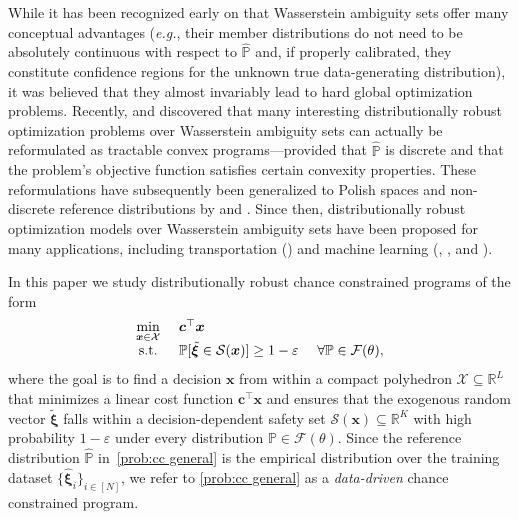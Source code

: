 \documentclass[nonblindrev]{informs2017}
\newcommand{\bmt}[1]{\tilde{\bm{#1}}}
\newcommand{\bmh}[1]{\hat{\bm{#1}}}
\newcommand{\1}[1]{\mathds{1}{\left(#1\right)}}
\begin{document}
While it has been recognized early on that Wasserstein ambiguity sets offer many conceptual advantages (\emph{e.g.}, their member distributions do not need to be absolutely continuous with respect to $\hat{\mathbb{P}}$ and, if properly calibrated, they constitute confidence regions for the unknown true data-generating distribution), it was believed that they almost invariably lead to hard global optimization problems. Recently, \citet{Esfahani_Kuhn_2017} and \citet{Zhao_Guan_2018} discovered that many interesting distributionally robust optimization problems over Wasserstein ambiguity sets can actually be reformulated as tractable convex programs---provided that $\hat{\mathbb{P}}$ is discrete and that the problem's objective function satisfies certain convexity properties. These reformulations have subsequently been generalized to Polish spaces and non-discrete reference distributions by \citet{blanchet2016quantifying} and \citet{Gao_Kleywegt_2016}. Since then, distributionally robust optimization models over Wasserstein ambiguity sets have been proposed for many applications, including transportation (\citealt{carlsson2015wasserstein}) and machine learning (\citealt{blanchet2016robust}, \citealt{gao2017distributional}, \citealt{shafieezadeh2017regularization} and \citealt{sinha2017certifiable}).

In this paper we study distributionally robust chance constrained programs of the form
\begin{equation}\label{prob:cc general}
\begin{array}{cll}
\displaystyle \min_{\bm{x} \in \mathcal{X}} &~\bm{c}^\top\bm{x} \\
{\rm s.t.} &~\displaystyle \mathbb{P}[\bmt{\xi} \in \mathcal{S}(\bm{x})] \geq 1-\varepsilon &~\forall \mathbb{P} \in \mathcal{F}(\theta),
\end{array}
\end{equation}
where the goal is to find a decision $\bm{x}$ from within a compact polyhedron $\mathcal{X} \subseteq \mathbb{R}^L$ that minimizes a linear cost function $\bm{c}^\top\bm{x}$ and ensures that the exogenous random vector $\bmt{\xi}$ falls within a decision-dependent safety set $\mathcal{S}(\bm{x}) \subseteq \mathbb{R}^K$ with high probability $1-\varepsilon$ under every distribution $\mathbb{P} \in \mathcal{F}(\theta)$. Since the reference distribution $\hat{\mathbb{P}}$ in~\eqref{prob:cc general} is the empirical distribution over the training dataset $\{\bmh{\xi}_i\}_{i \in [N]}$, we refer to  \eqref{prob:cc general} as a \emph{data-driven} chance constrained program.
\end{document}
